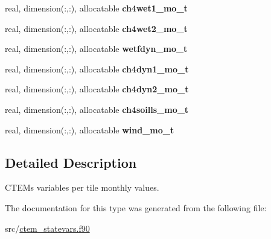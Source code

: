 \begin{DoxyCompactItemize}
\item 
\hypertarget{structctem__statevars_1_1ctem__tileavg__monthly_a2ce4d143bc2526dbc2cef120dbed07e5}{}real, dimension(\+:,\+:), allocatable {\bfseries ch4wet1\+\_\+mo\+\_\+t}\label{structctem__statevars_1_1ctem__tileavg__monthly_a2ce4d143bc2526dbc2cef120dbed07e5}

\item 
\hypertarget{structctem__statevars_1_1ctem__tileavg__monthly_a306a6f8f3f5fce2a7e911b0cd0a1fe58}{}real, dimension(\+:,\+:), allocatable {\bfseries ch4wet2\+\_\+mo\+\_\+t}\label{structctem__statevars_1_1ctem__tileavg__monthly_a306a6f8f3f5fce2a7e911b0cd0a1fe58}

\item 
\hypertarget{structctem__statevars_1_1ctem__tileavg__monthly_af233a6194f7defb630490648f35b5c16}{}real, dimension(\+:,\+:), allocatable {\bfseries wetfdyn\+\_\+mo\+\_\+t}\label{structctem__statevars_1_1ctem__tileavg__monthly_af233a6194f7defb630490648f35b5c16}

\item 
\hypertarget{structctem__statevars_1_1ctem__tileavg__monthly_a8fff116bb19c21ec0880be6d76975270}{}real, dimension(\+:,\+:), allocatable {\bfseries ch4dyn1\+\_\+mo\+\_\+t}\label{structctem__statevars_1_1ctem__tileavg__monthly_a8fff116bb19c21ec0880be6d76975270}

\item 
\hypertarget{structctem__statevars_1_1ctem__tileavg__monthly_a2bd7eb993074f1bc8fa0ef901b38447e}{}real, dimension(\+:,\+:), allocatable {\bfseries ch4dyn2\+\_\+mo\+\_\+t}\label{structctem__statevars_1_1ctem__tileavg__monthly_a2bd7eb993074f1bc8fa0ef901b38447e}

\item 
\hypertarget{structctem__statevars_1_1ctem__tileavg__monthly_a497388412a8b5cd61378ab370d318f47}{}real, dimension(\+:,\+:), allocatable {\bfseries ch4soills\+\_\+mo\+\_\+t}\label{structctem__statevars_1_1ctem__tileavg__monthly_a497388412a8b5cd61378ab370d318f47}

\item 
\hypertarget{structctem__statevars_1_1ctem__tileavg__monthly_a9d7a806e45c554eb6392627e435e2bdb}{}real, dimension(\+:,\+:), allocatable {\bfseries wind\+\_\+mo\+\_\+t}\label{structctem__statevars_1_1ctem__tileavg__monthly_a9d7a806e45c554eb6392627e435e2bdb}

\end{DoxyCompactItemize}


\subsection{Detailed Description}
C\+T\+E\+M\textquotesingle{}s variables per tile monthly values. 

The documentation for this type was generated from the following file\+:\begin{DoxyCompactItemize}
\item 
src/\hyperlink{ctem__statevars_8f90}{ctem\+\_\+statevars.\+f90}\end{DoxyCompactItemize}
